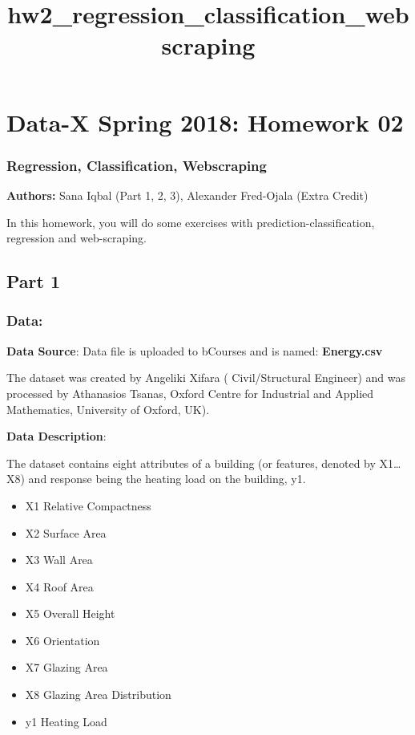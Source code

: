 \documentclass[11pt]{article}
\title{hw2\_regression\_classification\_webscraping}
\providecommand{\tightlist}{%
      \setlength{\itemsep}{0pt}\setlength{\parskip}{0pt}}
\begin{document}
    
    
    \maketitle
    
    

    
    \hypertarget{data-x-spring-2018-homework-02}{%
\section{Data-X Spring 2018: Homework
02}\label{data-x-spring-2018-homework-02}}

\hypertarget{regression-classification-webscraping}{%
\subsubsection{Regression, Classification,
Webscraping}\label{regression-classification-webscraping}}

\textbf{Authors:} Sana Iqbal (Part 1, 2, 3), Alexander Fred-Ojala (Extra
Credit)

In this homework, you will do some exercises with
prediction-classification, regression and web-scraping.

    \hypertarget{part-1}{%
\subsection{Part 1}\label{part-1}}

    \hypertarget{data}{%
\subsubsection{Data:}\label{data}}

\textbf{Data Source}: Data file is uploaded to bCourses and is named:
\textbf{Energy.csv}

The dataset was created by Angeliki Xifara ( Civil/Structural Engineer)
and was processed by Athanasios Tsanas, Oxford Centre for Industrial and
Applied Mathematics, University of Oxford, UK).

\textbf{Data Description}:

The dataset contains eight attributes of a building (or features,
denoted by X1\ldots{}X8) and response being the heating load on the
building, y1.

\begin{itemize}
\tightlist
\item
  X1 Relative Compactness
\item
  X2 Surface Area
\item
  X3 Wall Area
\item
  X4 Roof Area
\item
  X5 Overall Height
\item
  X6 Orientation
\item
  X7 Glazing Area
\item
  X8 Glazing Area Distribution
\item
  y1 Heating Load
\end{itemize}
\end{document}
